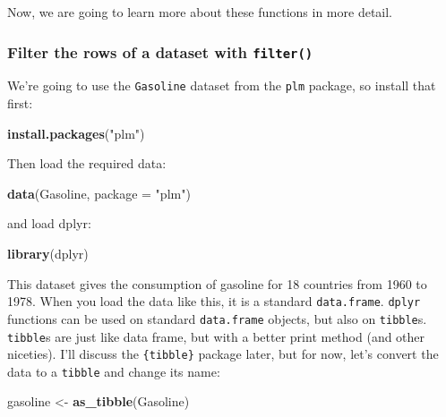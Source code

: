 \documentclass[]{gitbook}
\newenvironment{Shaded}{\begin{snugshade}}{\end{snugshade}}
\newcommand{\DataTypeTok}[1]{\textcolor[rgb]{0.13,0.29,0.53}{#1}}
\newcommand{\KeywordTok}[1]{\textcolor[rgb]{0.13,0.29,0.53}{\textbf{#1}}}
\newcommand{\NormalTok}[1]{#1}
\newcommand{\StringTok}[1]{\textcolor[rgb]{0.31,0.60,0.02}{#1}}
\theoremstyle{definition}
\theoremstyle{definition}
\theoremstyle{definition}
\theoremstyle{remark}
\begin{document}
Now, we are going to learn more about these functions in more detail.

\hypertarget{filter-the-rows-of-a-dataset-with-filter}{%
\subsubsection{\texorpdfstring{Filter the rows of a dataset with
\texttt{filter()}}{Filter the rows of a dataset with filter()}}\label{filter-the-rows-of-a-dataset-with-filter}}

We're going to use the \texttt{Gasoline} dataset from the \texttt{plm}
package, so install that first:

\begin{Shaded}
\begin{Highlighting}[]
\KeywordTok{install.packages}\NormalTok{(}\StringTok{"plm"}\NormalTok{)}
\end{Highlighting}
\end{Shaded}

Then load the required data:

\begin{Shaded}
\begin{Highlighting}[]
\KeywordTok{data}\NormalTok{(Gasoline, }\DataTypeTok{package =} \StringTok{"plm"}\NormalTok{)}
\end{Highlighting}
\end{Shaded}

and load dplyr:

\begin{Shaded}
\begin{Highlighting}[]
\KeywordTok{library}\NormalTok{(dplyr)}
\end{Highlighting}
\end{Shaded}

This dataset gives the consumption of gasoline for 18 countries from
1960 to 1978. When you load the data like this, it is a standard
\texttt{data.frame}. \texttt{dplyr} functions can be used on standard
\texttt{data.frame} objects, but also on \texttt{tibble}s.
\texttt{tibble}s are just like data frame, but with a better print
method (and other niceties). I'll discuss the \texttt{\{tibble\}}
package later, but for now, let's convert the data to a \texttt{tibble}
and change its name:

\begin{Shaded}
\begin{Highlighting}[]
\NormalTok{gasoline <-}\StringTok{ }\KeywordTok{as_tibble}\NormalTok{(Gasoline)}
\end{Highlighting}
\end{Shaded}
\end{document}
